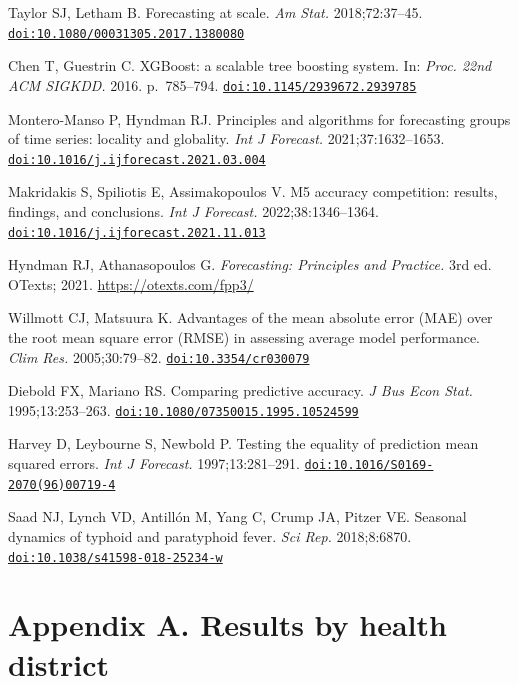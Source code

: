 \documentclass[11pt]{article}
\begin{document}
\begin{enumerate}[label={[\arabic*]},leftmargin=2.2em,itemsep=0.5pt]
\item\hypertarget{ref19}{}Taylor SJ, Letham B. Forecasting at scale. \textit{Am Stat.} 2018;72:37--45. \href{https://doi.org/10.1080/00031305.2017.1380080}{\nolinkurl{doi:10.1080/00031305.2017.1380080}}
\item\hypertarget{ref20}{}Chen T, Guestrin C. XGBoost: a scalable tree boosting system. In: \textit{Proc. 22nd ACM SIGKDD.} 2016. p.~785--794. \href{https://doi.org/10.1145/2939672.2939785}{\nolinkurl{doi:10.1145/2939672.2939785}}
\item\hypertarget{ref21}{}Montero-Manso P, Hyndman RJ. Principles and algorithms for forecasting groups of time series: locality and globality. \textit{Int J Forecast.} 2021;37:1632--1653. \href{https://doi.org/10.1016/j.ijforecast.2021.03.004}{\nolinkurl{doi:10.1016/j.ijforecast.2021.03.004}}
\item\hypertarget{ref22}{}Makridakis S, Spiliotis E, Assimakopoulos V. M5 accuracy competition: results, findings, and conclusions. \textit{Int J Forecast.} 2022;38:1346--1364. \href{https://doi.org/10.1016/j.ijforecast.2021.11.013}{\nolinkurl{doi:10.1016/j.ijforecast.2021.11.013}}
\item\hypertarget{ref23}{}Hyndman RJ, Athanasopoulos G. \textit{Forecasting: Principles and Practice.} 3rd ed. OTexts; 2021. \url{https://otexts.com/fpp3/}
\item\hypertarget{ref24}{}Willmott CJ, Matsuura K. Advantages of the mean absolute error (MAE) over the root mean square error (RMSE) in assessing average model performance. \textit{Clim Res.} 2005;30:79--82. \href{https://doi.org/10.3354/cr030079}{\nolinkurl{doi:10.3354/cr030079}}
\item\hypertarget{ref25}{}Diebold FX, Mariano RS. Comparing predictive accuracy. \textit{J Bus Econ Stat.} 1995;13:253--263. \href{https://doi.org/10.1080/07350015.1995.10524599}{\nolinkurl{doi:10.1080/07350015.1995.10524599}}
\item\hypertarget{ref26}{}Harvey D, Leybourne S, Newbold P. Testing the equality of prediction mean squared errors. \textit{Int J Forecast.} 1997;13:281--291. \href{https://doi.org/10.1016/S0169-2070(96)00719-4}{\nolinkurl{doi:10.1016/S0169-2070(96)00719-4}}
\item\hypertarget{ref27}{}Saad NJ, Lynch VD, Antillón M, Yang C, Crump JA, Pitzer VE. Seasonal dynamics of typhoid and paratyphoid fever. \textit{Sci Rep.} 2018;8:6870. \href{https://doi.org/10.1038/s41598-018-25234-w}{\nolinkurl{doi:10.1038/s41598-018-25234-w}}
\end{enumerate}


\section*{Appendix A. Results by health district}

\end{document}
